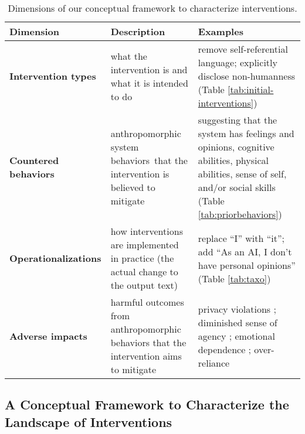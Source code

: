 \documentclass[11pt]{article}
\newcounter{intervention}  %
\newcommand{\cb}{behaviors}
\begin{document}
\begin{table*}[th!]
\centering\tiny
\def\arraystretch{0.95}
\setlength{\tabcolsep}{0.5em}
\begin{tabular}{@{}p{}|p{}|p{}@{}}
\textbf{Dimension} & \textbf{Description} & \textbf{Examples}\\ \hline %
\textbf{Intervention types} 
& %
what the intervention is and what it is intended to do
&  %
remove self-referential language; explicitly disclose non-humanness (Table \ref{tab:initial-interventions})
\\\hline %

\textbf{Countered behaviors} & 
anthropomorphic system \cb~that the intervention is believed to mitigate & suggesting that the system has feelings and opinions, cognitive abilities, physical abilities, sense of self, and/or social skills 
(Table \ref{tab:priorbehaviors})
\\ \hline

\textbf{Operationalizations} 
& how interventions are implemented in practice (the actual change to the output text) 
& replace ``I'' with ``it''; add ``As an
AI, I don’t have personal opinions'' (Table \ref{tab:taxo})
\\ \hline

\textbf{Adverse impacts} 
& harmful outcomes from anthropomorphic behaviors that the intervention aims to mitigate 
& privacy violations \cite{Ischen2020-it}; diminished sense of agency \cite{Bender2024}; emotional dependence \cite{Laestadius2022-ki}; over-reliance \cite{zhou-etal-2024-relying} %
\\ \hline

\end{tabular}
\vspace{-6pt}
\caption{Dimensions of our conceptual framework to characterize interventions. }
\label{tab:dims}
\vspace{-6pt}
\end{table*}


\subsection{A Conceptual Framework to Characterize the Landscape of Interventions}
\label{sec:framework}
 
\end{document}

